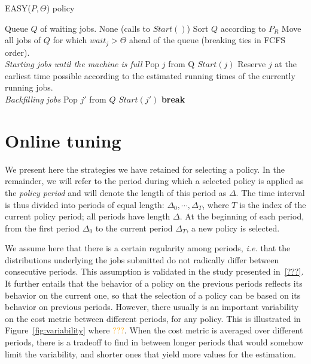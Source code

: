 \documentclass[sigconf]{acmart}
\begin{document}
\begin{algorithm}[h]
  \caption{EASY($P,\Theta$) policy}
  \begin{algorithmic}[1]
    \renewcommand{\algorithmicrequire}{\textbf{Input:}}
    \renewcommand{\algorithmicensure}{\textbf{Output:}}
    \REQUIRE Queue $Q$ of waiting jobs.
    \ENSURE None (calls to $Start()$)
    \STATE Sort $Q$ according to $P_R$
    \STATE Move all jobs of $Q$ for which $wait_j > \Theta$ ahead
    of the queue (breaking ties in FCFS order).
    \\ \textit{Starting jobs until the machine is full}
    \STATE Pop $j$ from Q
    \STATE $Start(j)$
    \ELSE
    \STATE Reserve $j$ at the earliest
    time possible according to the estimated running times
    of the currently running jobs.
    \\ \textit{Backfilling jobs}
    \STATE Pop $j'$ from $Q$
    \STATE $Start(j')$
    \ENDIF
    \ENDFOR
    \STATE \textbf{break}
    \ENDIF
    \ENDFOR
  \end{algorithmic}
  \label{alg:EASY}
\end{algorithm}

\section{Online tuning}
\label{sec:online}

We present here the strategies we have retained for selecting a policy. In the remainder, we will refer to the period during which a selected policy is applied as the \textit{policy period} and will denote the length of this period as $\Delta$. The time interval is thus divided into periods of equal length: $\Delta_0, \cdots, \Delta_T$, where $T$ is the index of the current policy period; all periods have length $\Delta$. At the beginning of each period, from the first period $\Delta_0$ to the current period $\Delta_T$, a new policy is selected. 

We assume here that there is a certain regularity among periods, \textit{i.e.} that the distributions underlying the jobs submitted do not radically differ between consecutive periods. This assumption is validated in the study presented in~\ref{???}. It further entails that the behavior of a policy on the previous periods reflects its behavior on the current one, so that the selection of a policy can be based on its behavior on previous periods. However, there usually is an important variability on the cost metric between different periods, for any policy. This is illustrated in Figure~\ref{fig:variability} where \textcolor{orange}{???}. When the cost metric is averaged over different periods, there is a tradeoff to find in between longer periods that would somehow limit the variability, and shorter ones that yield more values for the estimation.
\end{document}
